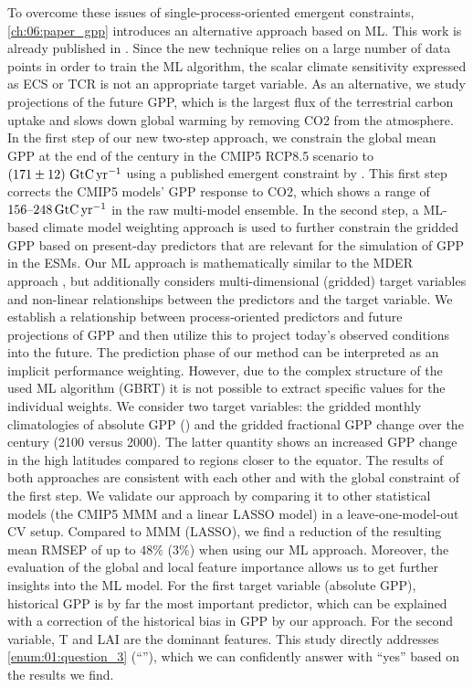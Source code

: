 To overcome these issues of single-process-oriented emergent constraints,
\cref{ch:06:paper_gpp} introduces an alternative approach based on \ac{ML}.
This work is already published in \textcite{Schlund2020}. Since the new
technique relies on a large number of data points in order to train the \ac{ML}
algorithm, the scalar climate sensitivity expressed as \ac{ECS} or \ac{TCR} is
not an appropriate target variable. As an alternative, we study projections of
the future \ac{GPP}, which is the largest flux of the terrestrial carbon uptake
and slows down global warming by removing \ac{CO2} from the atmosphere. In the
first step of our new two-step approach, we constrain the global mean \ac{GPP}
at the end of the  century in the \acs{CMIP}5 \acs{RCP}8.5 scenario to
$\pmrangeunit{171}{12}{\GtCyr{}}$ using a published emergent constraint by
\textcite{Wenzel2016}. This first step corrects the \acs{CMIP}5 models'
\ac{GPP} response to \ac{CO2}, which shows a range of
$\rangeunit{156}{248}{\GtCyr{}}$ in the raw multi-model ensemble. In the second
step, a \ac{ML}-based climate model weighting approach is used to further
constrain the gridded \ac{GPP} based on present-day predictors that are
relevant for the simulation of \ac{GPP} in the \acp{ESM}. Our \ac{ML} approach
is mathematically similar to the \ac{MDER} approach \autocite{Karpechko2013,
  Senftleben2020, Wenzel2016a}, but additionally considers multi-dimensional
(gridded) target variables and non-linear relationships between the predictors
and the target variable. We establish a relationship between process‐oriented
predictors and future projections of \ac{GPP} and then utilize this to project
today's observed conditions into the future. The prediction phase of our method
can be interpreted as an implicit performance weighting. However, due to the
complex structure of the used \ac{ML} algorithm (\ac{GBRT}) it is not possible
to extract specific values for the individual weights. We consider two target
variables: the gridded monthly climatologies of absolute \ac{GPP}
() and the gridded fractional \ac{GPP} change over the
 century (2100 versus 2000). The latter quantity shows an increased
\acs{GPP} change in the high latitudes compared to regions closer to the
equator. The results of both approaches are consistent with each other and with
the global constraint of the first step. We validate our approach by comparing
it to other statistical models (the \acs{CMIP}5 \ac{MMM} and a linear
\ac{LASSO} model) in a leave‐one‐model‐out \ac{CV} setup. Compared to \ac{MMM}
(\ac{LASSO}), we find a reduction of the resulting mean \ac{RMSEP} of up to $48
\unit{\%}$ ($3 \unit{\%}$) when using our \ac{ML} approach. Moreover, the
evaluation of the global and local feature importance allows us to get further
insights into the \ac{ML} model. For the first target variable (absolute
\ac{GPP}), historical \ac{GPP} is by far the most important predictor, which
can be explained with a correction of the historical bias in \ac{GPP} by our
approach. For the second variable, \ac{T} and \ac{LAI} are the dominant
features. This study directly addresses \cref{enum:01:question_3}
(\enquote{\emph{\KeyScienceQuestionThree{}}}), which we can confidently answer
with \enquote{yes} based on the results we find.


